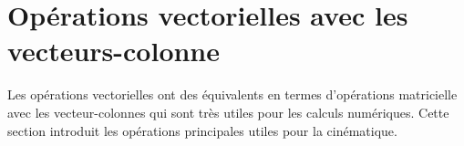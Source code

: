 




\section{Opérations vectorielles avec les vecteurs-colonne}
\label{sec:opeveccol}
%
Les opérations vectorielles ont des équivalents en termes d'opérations matricielle avec les vecteur-colonnes qui sont très utiles pour les calculs numériques. Cette section introduit les opérations principales utiles pour la cinématique.

